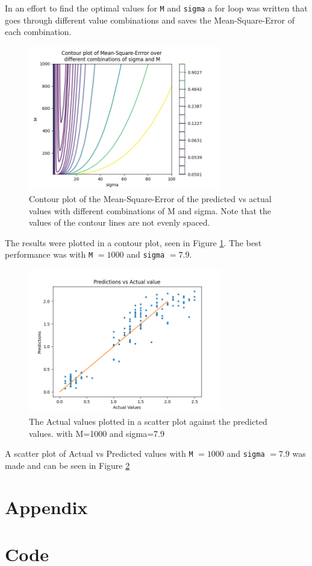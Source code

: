 \documentclass{article}
\begin{document}
In an effort to find the optimal values for \verb!M! and \verb!sigma! a for loop was written that goes through different value combinations and saves the Mean-Square-Error of each combination.
\begin{figure}[H]
    \centering
    \includegraphics[width=0.75\textwidth]{07_linear_models/indep1.png}
    \caption{Contour plot of the Mean-Square-Error of the predicted vs actual values with different combinations of M and sigma. Note that the values of the contour lines are not evenly spaced. }
    \label{fig:indep1}
\end{figure}

The results were plotted in a contour plot, seen in Figure \ref{fig:indep1}. The best performance was with \verb!M! $=1000$ and \verb!sigma! $=7.9$.

\begin{figure}[H]
    \centering
    \includegraphics[width=0.75\textwidth]{07_linear_models/plot_1_5_best.png}
    \caption{The Actual values plotted in a scatter plot against the predicted values. with M=1000 and sigma=7.9}
    \label{fig:final}
\end{figure}


A scatter plot of Actual vs Predicted values with \verb!M! $=1000$ and \verb!sigma! $=7.9$ was made and can be seen in Figure \ref{fig:final}

\newpage
\section*{Appendix}
\appendix
\section{Code}


\end{document}
